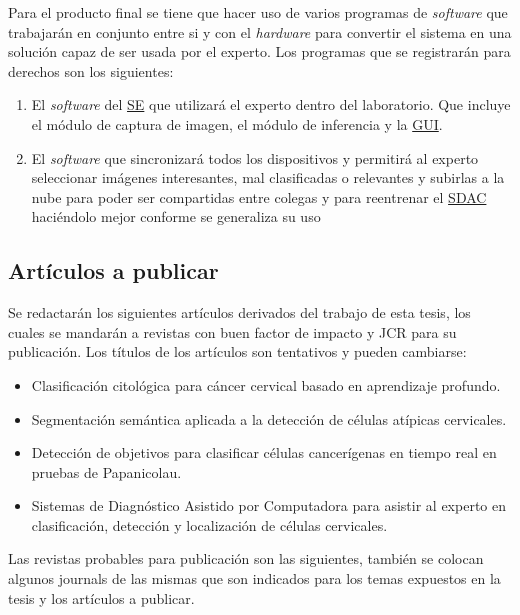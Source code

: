 Para el producto final se tiene que hacer uso de varios programas de
\emph{software} que trabajarán en conjunto entre si y con el \emph{hardware} para
convertir el sistema en una solución capaz de ser usada por el experto. Los programas que se
registrarán para derechos son los siguientes:

\begin{enumerate}
    \item El \emph{software} del \hyperlink{abbr}{SE} que utilizará el experto
    dentro del laboratorio. Que incluye el módulo de captura de imagen, el módulo
    de inferencia y la \hyperlink{abbr}{GUI}.
    \item El \emph{software} que sincronizará todos los dispositivos y permitirá
    al experto seleccionar imágenes interesantes, mal clasificadas o relevantes
    y subirlas a la nube para poder ser compartidas entre colegas y para
    reentrenar el \hyperlink{abbr}{SDAC} haciéndolo mejor conforme se generaliza
    su uso
\end{enumerate}

\subsection{Artículos a publicar}

Se redactarán los siguientes artículos derivados del trabajo de esta tesis, los
cuales se mandarán a revistas con buen factor de impacto y JCR para su
publicación. Los títulos de los artículos son tentativos y pueden cambiarse:

\begin{itemize}
    \item Clasificación citológica para cáncer cervical basado en aprendizaje
    profundo.
    \item Segmentación semántica aplicada a la detección de células atípicas
    cervicales.
    \item Detección de objetivos para clasificar células cancerígenas en tiempo
    real en pruebas de Papanicolau.
    \item Sistemas de Diagnóstico Asistido por Computadora para asistir al
    experto en clasificación, detección y localización de células cervicales.
\end{itemize}

Las revistas probables para publicación son las siguientes, también se colocan
algunos journals de las mismas que son indicados para los temas expuestos en la
tesis y los artículos a publicar.

